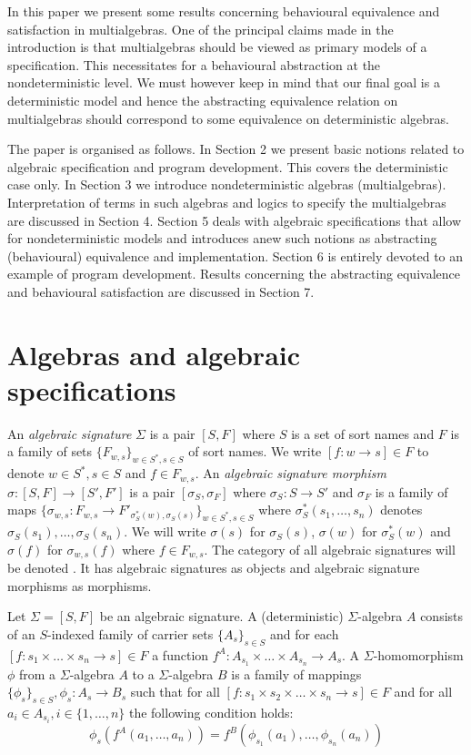 In this paper we present some results concerning behavioural
equivalence and satisfaction in multialgebras.  One of the principal
claims made in the introduction is that multialgebras should be viewed
as primary models of a specification. This necessitates for a
behavioural abstraction at the nondeterministic level. We must however
keep in mind that our final goal is a deterministic model and hence
the abstracting equivalence relation on multialgebras should
correspond to some equivalence on deterministic algebras.

The paper is organised as follows. In Section 2 we present basic
notions related to algebraic specification and program
development. This covers the deterministic case only. In Section 3 we
introduce nondeterministic algebras (multialgebras). Interpretation of
terms in such algebras and logics to specify the multialgebras are
discussed in Section 4. Section 5 deals with algebraic specifications
that allow for nondeterministic models and introduces anew such
notions as abstracting (behavioural) equivalence and implementation.
Section 6 is entirely devoted to an example of program
development. Results concerning the abstracting equivalence and
behavioural satisfaction are discussed in Section 7.

\section{Algebras and algebraic specifications}

An {\em algebraic signature} $\Sigma$ is a pair $[S,F]$ where $S$ is a
set of sort names and $F$ is a family of sets $\{F_{w,s}\}_{w \in
S^\ast, s \in S}$ of sort names. We write $[f : w \rightarrow s] \in
F$ to denote $w \in S^\ast, s \in S$ and $f \in F_{w,s}$. An {\em
algebraic signature morphism} $\sigma : [S,F] \rightarrow [S',F']$ is
a pair $[\sigma_S,\sigma_F]$ where $\sigma_S : S \rightarrow S'$ and
$\sigma_F$ is a family of maps $\{\sigma_{w,s} : F_{w,s} \rightarrow
F'_{\sigma^\ast_S(w),\sigma_S(s)}\}_{w \in S^\ast, s \in S}$ where
$\sigma^\ast_S(s_1,\ldots,s_n)$ denotes
$\sigma_S(s_1),\ldots,\sigma_S(s_n)$. We will write $\sigma(s)$ for
$\sigma_S(s)$, $\sigma(w)$ for $\sigma^\ast_S(w)$ and $\sigma(f)$ for
$\sigma_{w,s}(f)$ where $f \in F_{w,s}$.  The category of all
algebraic signatures will be denoted \AlgSig. It has algebraic
signatures as objects and algebraic signature morphisms as morphisms.

Let $\Sigma = [S,F]$ be an algebraic signature. A (deterministic)
$\Sigma$-algebra $A$ consists of an $S$-indexed family of carrier sets
$\{A_s\}_{s \in S}$ and for each $[f : s_1 \times \ldots \times s_n
\rightarrow s] \in F$ a function $f^A : A_{s_1} \times \ldots \times
A_{s_n} \rightarrow A_s$.  A $\Sigma$-homomorphism $\phi$ from a
$\Sigma$-algebra $A$ to a $\Sigma$-algebra $B$ is a family of mappings
$\{\phi_s\}_{s \in S}, \phi_s: A_s \rightarrow B_s$ such that for all
$[f:s_1 \times s_2 \times \ldots \times s_n \rightarrow s] \in F$ and
for all $a_i \in A_{s_i}, i \in \{1,\ldots,n\}$ the following
condition holds:
\[ 
\phi_s(f^A(a_1,\ldots,a_n)) =
f^B(\phi_{s_1}(a_1),\ldots,\phi_{s_n}(a_n))
\]

